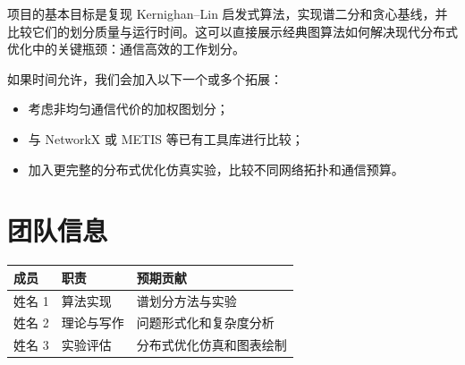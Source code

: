 \documentclass[UTF8, 10pt]{ctexart}
\begin{document}
项目的基本目标是复现 Kernighan--Lin 启发式算法，实现谱二分和贪心基线，并
比较它们的划分质量与运行时间。这可以直接展示经典图算法如何解决现代分布式
优化中的关键瓶颈：通信高效的工作划分。

如果时间允许，我们会加入以下一个或多个拓展：
\begin{itemize}
    \item 考虑非均匀通信代价的加权图划分；
    \item 与 NetworkX 或 METIS 等已有工具库进行比较；
    \item 加入更完整的分布式优化仿真实验，比较不同网络拓扑和通信预算。
\end{itemize}

\section{团队信息}

\begin{tabular}{@{}lll@{}}
\toprule
成员 & 职责 & 预期贡献 \\
\midrule
姓名 1 & 算法实现 & 谱划分方法与实验 \\
姓名 2 & 理论与写作 & 问题形式化和复杂度分析 \\
姓名 3 & 实验评估 & 分布式优化仿真和图表绘制 \\
\bottomrule
\end{tabular}
\end{document}
